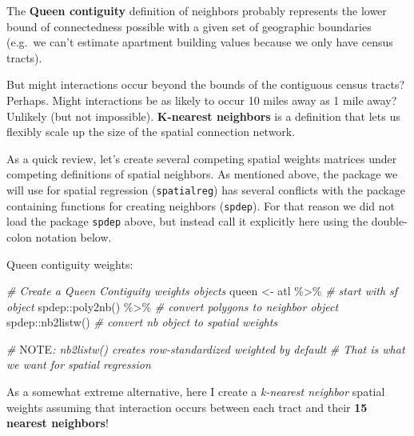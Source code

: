 \documentclass[
]{book}
\newenvironment{Shaded}{\begin{snugshade}}{\end{snugshade}}
\newcommand{\AlertTok}[1]{\textcolor[rgb]{0.94,0.16,0.16}{#1}}
\newcommand{\CommentTok}[1]{\textcolor[rgb]{0.56,0.35,0.01}{\textit{#1}}}
\newcommand{\FunctionTok}[1]{\textcolor[rgb]{0.00,0.00,0.00}{#1}}
\newcommand{\NormalTok}[1]{#1}
\newcommand{\OtherTok}[1]{\textcolor[rgb]{0.56,0.35,0.01}{#1}}
\newcommand{\SpecialCharTok}[1]{\textcolor[rgb]{0.00,0.00,0.00}{#1}}
\begin{document}
The \textbf{Queen contiguity} definition of neighbors probably represents the lower bound of connectedness possible with a given set of geographic boundaries (e.g.~we can't estimate apartment building values because we only have census tracts).

But might interactions occur beyond the bounds of the contiguous census tracts? Perhaps. Might interactions be as likely to occur 10 miles away as 1 mile away? Unlikely (but not impossible). \textbf{K-nearest neighbors} is a definition that lets us flexibly scale up the size of the spatial connection network.

As a quick review, let's create several competing spatial weights matrices under competing definitions of spatial neighbors. As mentioned above, the package we will use for spatial regression (\texttt{spatialreg}) has several conflicts with the package containing functions for creating neighbors (\texttt{spdep}). For that reason we did not load the package \texttt{spdep} above, but instead call it explicitly here using the double-colon notation below.

Queen contiguity weights:

\begin{Shaded}
\begin{Highlighting}[]
\CommentTok{\# Create a Queen Contiguity weights objects}
\NormalTok{queen }\OtherTok{\textless{}{-}}\NormalTok{ atl }\SpecialCharTok{\%\textgreater{}\%} \CommentTok{\# start with sf object}
\NormalTok{  spdep}\SpecialCharTok{::}\FunctionTok{poly2nb}\NormalTok{() }\SpecialCharTok{\%\textgreater{}\%}      \CommentTok{\# convert polygons to neighbor object}
\NormalTok{  spdep}\SpecialCharTok{::}\FunctionTok{nb2listw}\NormalTok{()         }\CommentTok{\# convert nb object to spatial weights}

\CommentTok{\# }\AlertTok{NOTE}\CommentTok{: nb2listw() creates row{-}standardized weighted by default}
\CommentTok{\# That is what we want for spatial regression}
\end{Highlighting}
\end{Shaded}

As a somewhat extreme alternative, here I create a \emph{k-nearest neighbor} spatial weights assuming that interaction occurs between each tract and their \textbf{15 nearest neighbors}!
\end{document}
